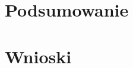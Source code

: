 \documentclass[a4paper,12pts]{article}
\begin{document}

	\section{Podsumowanie}


	\section{Wnioski}
	
\end{document}
